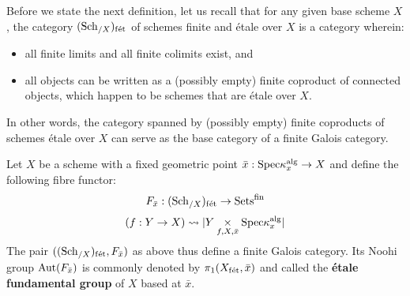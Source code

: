         Before we state the next definition, let us recall that for any given base scheme $X$, the category $(\mathrm{Sch}_{/X})_{\mathrm{f\acute{e}t}}$ of schemes finite and \'etale over $X$ is a category wherein:
            \begin{itemize}
                \item all finite limits and all finite colimits exist, and
                \item all objects can be written as a (possibly empty) finite coproduct of connected objects, which happen to be schemes that are \'etale over $X$.  
            \end{itemize}
        In other words, the category spanned by (possibly empty) finite coproducts of schemes \'etale over $X$ can serve as the base category of a finite Galois category. 
        \begin{definition} \label{def: etale_fundamental_groups}
            Let $X$ be a scheme with a fixed geometric point $\bar{x}: \mathrm{Spec} \kappa_x^{\mathrm{alg}} \to X$ and define the following fibre functor:
                $$F_{\bar{x}}: (\mathrm{Sch}_{/X})_{\mathrm{f\acute{e}t}} \to \mathrm{Sets}^{\mathrm{fin}}$$
                $$(f: Y \to X) \mapsto |Y \x_{f, X, \bar{x}} \Spec \kappa_x^{\alg}|$$
            The pair $((\mathrm{Sch}_{/X})_{\mathrm{f\acute{e}t}}, F_{\bar{x}})$ as above thus define a finite Galois category. Its Noohi group $\mathrm{Aut}(F_{\bar{x}})$ is commonly denoted by $\pi_1(X_{\mathrm{f\acute{e}t}}, \bar{x})$ and called the \textbf{\'etale fundamental group} of $X$ based at $\bar{x}$.
        \end{definition}
